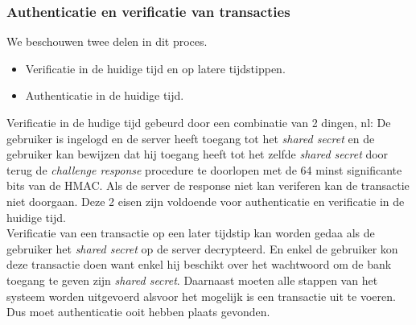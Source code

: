 \documentclass[11pt]{article}
\begin{document}
\subsubsection{Authenticatie en verificatie van transacties}
We beschouwen twee delen in dit proces.
\begin{itemize}
\item Verificatie in de huidige tijd en op latere tijdstippen.
\item Authenticatie in de huidige tijd.
\end{itemize}
Verificatie in de hudige tijd gebeurd door een combinatie van 2 dingen, nl: De gebruiker is ingelogd en de server heeft toegang tot het \emph{shared secret} en de gebruiker kan bewijzen dat hij toegang heeft tot het zelfde \emph{shared secret} door terug de \emph{challenge response} procedure te doorlopen met de 64 minst significante bits van de HMAC. Als de server de response niet kan veriferen kan de transactie niet doorgaan. Deze 2 eisen zijn voldoende voor authenticatie en verificatie in de huidige tijd. \\

Verificatie van een transactie op een later tijdstip kan worden gedaa als de gebruiker het \emph{shared secret} op de server decrypteerd. En enkel de gebruiker kon deze transactie doen want enkel hij beschikt over het wachtwoord om de bank toegang te geven zijn \emph{shared secret}. Daarnaast moeten alle stappen van het systeem worden uitgevoerd alsvoor het mogelijk is een transactie uit te voeren. Dus moet authenticatie ooit hebben plaats gevonden.
\end{document}
